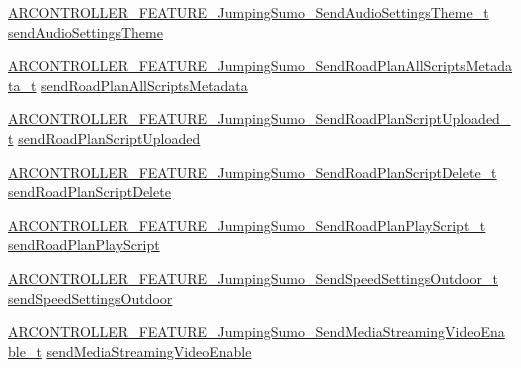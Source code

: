 \begin{DoxyCompactItemize}
\item 
\hyperlink{_a_r_c_o_n_t_r_o_l_l_e_r___feature_8h_a05599448e7d56a9a900d3450b8ce0fa4}{A\+R\+C\+O\+N\+T\+R\+O\+L\+L\+E\+R\+\_\+\+F\+E\+A\+T\+U\+R\+E\+\_\+\+Jumping\+Sumo\+\_\+\+Send\+Audio\+Settings\+Theme\+\_\+t} \hyperlink{struct_a_r_c_o_n_t_r_o_l_l_e_r___f_e_a_t_u_r_e___jumping_sumo__t_a062a6e95366dc38089980de422130594}{send\+Audio\+Settings\+Theme}
\item 
\hyperlink{_a_r_c_o_n_t_r_o_l_l_e_r___feature_8h_a646bc76a6ff0c278064152ee8f9f11b3}{A\+R\+C\+O\+N\+T\+R\+O\+L\+L\+E\+R\+\_\+\+F\+E\+A\+T\+U\+R\+E\+\_\+\+Jumping\+Sumo\+\_\+\+Send\+Road\+Plan\+All\+Scripts\+Metadata\+\_\+t} \hyperlink{struct_a_r_c_o_n_t_r_o_l_l_e_r___f_e_a_t_u_r_e___jumping_sumo__t_a1b7d1f51831da4a051699aee0338797a}{send\+Road\+Plan\+All\+Scripts\+Metadata}
\item 
\hyperlink{_a_r_c_o_n_t_r_o_l_l_e_r___feature_8h_af9d23bd4952ac8fce11f7a7428c6371e}{A\+R\+C\+O\+N\+T\+R\+O\+L\+L\+E\+R\+\_\+\+F\+E\+A\+T\+U\+R\+E\+\_\+\+Jumping\+Sumo\+\_\+\+Send\+Road\+Plan\+Script\+Uploaded\+\_\+t} \hyperlink{struct_a_r_c_o_n_t_r_o_l_l_e_r___f_e_a_t_u_r_e___jumping_sumo__t_acd3c3573faf84095b735ccb5cd360a9a}{send\+Road\+Plan\+Script\+Uploaded}
\item 
\hyperlink{_a_r_c_o_n_t_r_o_l_l_e_r___feature_8h_a58cc645ad43e44919df4f96d18e9f3d8}{A\+R\+C\+O\+N\+T\+R\+O\+L\+L\+E\+R\+\_\+\+F\+E\+A\+T\+U\+R\+E\+\_\+\+Jumping\+Sumo\+\_\+\+Send\+Road\+Plan\+Script\+Delete\+\_\+t} \hyperlink{struct_a_r_c_o_n_t_r_o_l_l_e_r___f_e_a_t_u_r_e___jumping_sumo__t_a7add7a01dfb1384063b1ba90f1f5392f}{send\+Road\+Plan\+Script\+Delete}
\item 
\hyperlink{_a_r_c_o_n_t_r_o_l_l_e_r___feature_8h_afd209dc980400844ed0ccdc0fb10ab6b}{A\+R\+C\+O\+N\+T\+R\+O\+L\+L\+E\+R\+\_\+\+F\+E\+A\+T\+U\+R\+E\+\_\+\+Jumping\+Sumo\+\_\+\+Send\+Road\+Plan\+Play\+Script\+\_\+t} \hyperlink{struct_a_r_c_o_n_t_r_o_l_l_e_r___f_e_a_t_u_r_e___jumping_sumo__t_a30dd4862f2bf10279e35d609ca30b349}{send\+Road\+Plan\+Play\+Script}
\item 
\hyperlink{_a_r_c_o_n_t_r_o_l_l_e_r___feature_8h_a37942b2ce87577701e8c86bd48c45469}{A\+R\+C\+O\+N\+T\+R\+O\+L\+L\+E\+R\+\_\+\+F\+E\+A\+T\+U\+R\+E\+\_\+\+Jumping\+Sumo\+\_\+\+Send\+Speed\+Settings\+Outdoor\+\_\+t} \hyperlink{struct_a_r_c_o_n_t_r_o_l_l_e_r___f_e_a_t_u_r_e___jumping_sumo__t_aff2049dd21f05f97f6a570814d97aa76}{send\+Speed\+Settings\+Outdoor}
\item 
\hyperlink{_a_r_c_o_n_t_r_o_l_l_e_r___feature_8h_ad0bcf5393a9b801da910fa8030642411}{A\+R\+C\+O\+N\+T\+R\+O\+L\+L\+E\+R\+\_\+\+F\+E\+A\+T\+U\+R\+E\+\_\+\+Jumping\+Sumo\+\_\+\+Send\+Media\+Streaming\+Video\+Enable\+\_\+t} \hyperlink{struct_a_r_c_o_n_t_r_o_l_l_e_r___f_e_a_t_u_r_e___jumping_sumo__t_a60651e6c0dce5f68f85bc74a09975884}{send\+Media\+Streaming\+Video\+Enable}

\end{DoxyCompactItemize}
